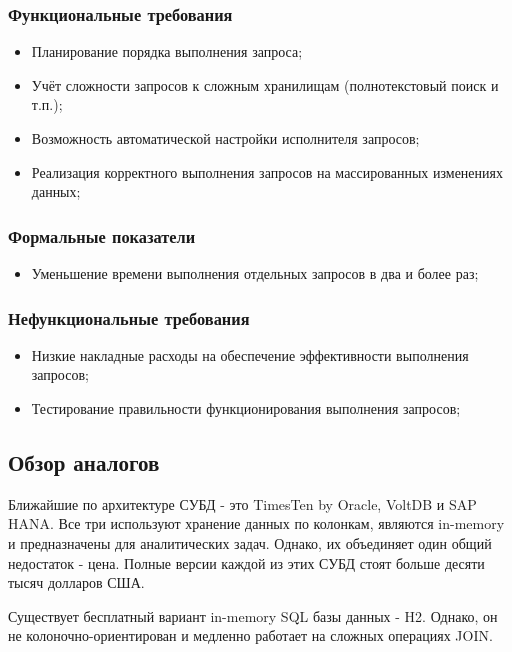 \documentclass{matmex-diploma}
\begin{document}
        \subsubsection{Функциональные требования}
            \begin{itemize}
                \item Планирование порядка выполнения запроса;
                \item Учёт сложности запросов к сложным хранилищам (полнотекстовый поиск и т.п.);
                \item Возможность автоматической настройки исполнителя запросов;
                \item Реализация корректного выполнения запросов на массированных изменениях данных;
            \end{itemize}
        \subsubsection{Формальные показатели}
            \begin{itemize} 
                \item Уменьшение времени выполнения отдельных запросов в два и более раз;
            \end{itemize}
        \subsubsection{Нефункциональные требования}
            \begin{itemize} 
                    \item Низкие накладные расходы на обеспечение эффективности выполнения запросов;
                    \item Тестирование правильности функционирования выполнения запросов;
            \end{itemize}
    \subsection{Обзор аналогов}
        Ближайшие по архитектуре СУБД - это TimesTen by Oracle, VoltDB и SAP HANA. Все три используют хранение данных по колонкам, являются in-memory и предназначены для аналитических задач. Однако, их объединяет один общий недостаток - цена. Полные версии каждой из этих СУБД стоят больше десяти тысяч долларов США.
    
    Существует бесплатный вариант in-memory SQL базы данных - H2. Однако, он не колоночно-ориентирован и медленно работает на сложных операциях JOIN.
    
\end{document}
